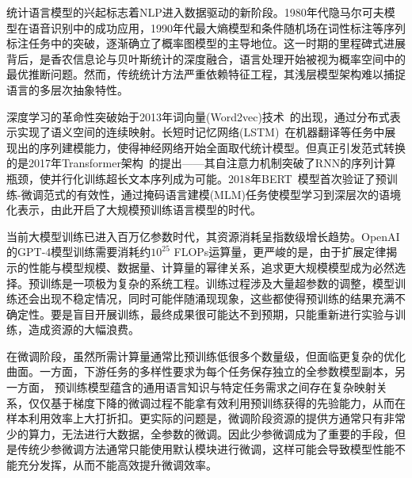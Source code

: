 统计语言模型的兴起标志着NLP进入数据驱动的新阶段。1980年代隐马尔可夫模型在语音识别中的成功应用，1990年代最大熵模型和条件随机场在词性标注等序列标注任务中的突破，逐渐确立了概率图模型的主导地位。这一时期的里程碑式进展背后，是香农信息论与贝叶斯统计的深度融合，语言处理开始被视为概率空间中的最优推断问题。然而，传统统计方法严重依赖特征工程，其浅层模型架构难以捕捉语言的多层次抽象特性。

深度学习的革命性突破始于2013年词向量(Word2vec)技术~\cite{mikolov2013efficient}的出现，通过分布式表示实现了语义空间的连续映射。长短时记忆网络(LSTM)~\cite{hochreiter1997long}在机器翻译等任务中展现出的序列建模能力，使得神经网络开始全面取代统计模型。但真正引发范式转换的是2017年Transformer架构~\cite{Vaswani+2017}的提出——其自注意力机制突破了RNN的序列计算瓶颈，使并行化训练超长文本序列成为可能。2018年BERT~\cite{devlin2018bert}模型首次验证了预训练-微调范式的有效性，通过掩码语言建模(MLM)任务使模型学习到深层次的语境化表示，由此开启了大规模预训练语言模型的时代。


当前大模型训练已进入百万亿参数时代，其资源消耗呈指数级增长趋势。OpenAI的GPT-4模型训练需要消耗约$10^{25}$ FLOPs运算量，更严峻的是，由于扩展定律揭示的性能与模型规模、数据量、计算量的幂律关系，追求更大规模模型成为必然选择。预训练是一项极为复杂的系统工程。训练过程涉及大量超参数的调整，模型训练还会出现不稳定情况，同时可能伴随涌现现象，这些都使得预训练的结果充满不确定性。要是盲目开展训练，最终成果很可能达不到预期，只能重新进行实验与训练，造成资源的大幅浪费。

在微调阶段，虽然所需计算量通常比预训练低很多个数量级，但面临更复杂的优化曲面。一方面，下游任务的多样性要求为每个任务保存独立的全参数模型副本，另一方面， 预训练模型蕴含的通用语言知识与特定任务需求之间存在复杂映射关系，仅仅基于梯度下降的微调过程不能拿有效利用预训练获得的先验能力，从而在样本利用效率上大打折扣。更实际的问题是，微调阶段资源的提供方通常只有非常少的算力，无法进行大数据，全参数的微调。因此少参微调成为了重要的手段，但是传统少参微调方法通常只能使用默认模块进行微调，这样可能会导致模型性能不能充分发挥，从而不能高效提升微调效率。






